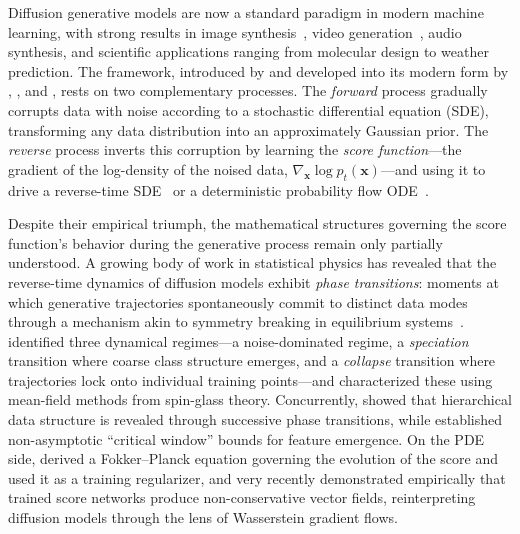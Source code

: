 \documentclass[11pt]{article}
\begin{document}
Diffusion generative models are now a standard paradigm in modern machine learning, with strong results in image synthesis~\citep{dhariwal2021diffusion, rombach2022high}, video generation~\citep{ho2022video}, audio synthesis, and scientific applications ranging from molecular design to weather prediction.
The framework, introduced by \citet{sohl2015deep} and developed into its modern form by \citet{song2019generative}, \citet{ho2020denoising}, and \citet{song2021score}, rests on two complementary processes.
The \emph{forward} process gradually corrupts data with noise according to a stochastic differential equation (SDE), transforming any data distribution into an approximately Gaussian prior.
The \emph{reverse} process inverts this corruption by learning the \emph{score function}---the gradient of the log-density of the noised data, $\nabla_{\bm{x}} \log p_t(\bm{x})$---and using it to drive a reverse-time SDE~\citep{anderson1982reverse} or a deterministic probability flow ODE~\citep{song2021score}.

Despite their empirical triumph, the mathematical structures governing the score function's behavior during the generative process remain only partially understood.
A growing body of work in statistical physics has revealed that the reverse-time dynamics of diffusion models exhibit \emph{phase transitions}: moments at which generative trajectories spontaneously commit to distinct data modes through a mechanism akin to symmetry breaking in equilibrium systems~\citep{raya2023spontaneous, biroli2023generative, biroli2024dynamical, ambrogioni2025thermodynamics}.
\citet{biroli2024dynamical} identified three dynamical regimes---a noise-dominated regime, a \emph{speciation} transition where coarse class structure emerges, and a \emph{collapse} transition where trajectories lock onto individual training points---and characterized these using mean-field methods from spin-glass theory.
Concurrently, \citet{sclocchi2024phase} showed that hierarchical data structure is revealed through successive phase transitions, while \citet{li2024critical} established non-asymptotic ``critical window'' bounds for feature emergence.
On the PDE side, \citet{lai2023fp} derived a Fokker--Planck equation governing the evolution of the score and used it as a training regularizer, and very recently \citet{vuong2025score} demonstrated empirically that trained score networks produce non-conservative vector fields, reinterpreting diffusion models through the lens of Wasserstein gradient flows.
\end{document}
